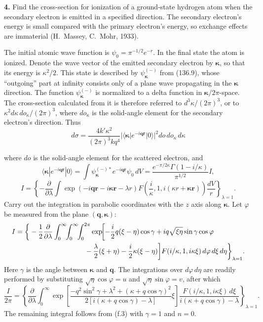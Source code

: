 \noindent\textbf{4.} Find the cross-section for ionization of a ground-state
hydrogen atom when the secondary electron is emitted in a specified direction.
The secondary electron's energy is small compared with the primary electron's
energy, so exchange effects are immaterial (H.~Massey, C.~Mohr, 1933).

\SolutionHeading The initial atomic wave function is
$\psi_0=\pi^{-1/2}e^{-r}$.  In the final state the atom is ionized.  Denote the
wave vector of the emitted secondary electron by $\boldsymbol\kappa$, so that
its energy is $\kappa^2/2$.  This state is described by
$\psi_{\boldsymbol\kappa}^{(-)}$ from (136.9), whose ``outgoing'' part at
infinity consists only of a plane wave propagating in the
$\boldsymbol\kappa$ direction.  The function
$\psi_{\boldsymbol\kappa}^{(-)}$ is normalized to a delta function in
$\boldsymbol\kappa/2\pi$-space.  The cross-section calculated from it is
therefore referred to $d^3\kappa/(2\pi)^3$, or to
$\kappa^2d\kappa\,do_{\kappa}/(2\pi)^3$, where $do_{\kappa}$ is the
solid-angle element for the secondary electron's direction.  Thus
\[
 d\sigma=\frac{4k'\kappa^2}{(2\pi)^3kq^4}
 |\langle\boldsymbol\kappa|e^{-i\mathbf q\mathbf r}|0\rangle|^2
 do\,do_{\kappa}\,d\kappa
\]

where $do$ is the solid-angle element for the scattered electron, and
\[
 \langle\boldsymbol\kappa|e^{-i\mathbf q\mathbf r}|0\rangle
 =\int\psi_{\boldsymbol\kappa}^{(-)*}e^{-i\mathbf q\mathbf r}\psi_0\,dV
 =\frac{e^{-\pi/2\kappa}\Gamma(1-i/\kappa)}{\pi^{1/2}}I,
\]
\[
 I=\left\{-\frac\partial{\partial\lambda}\int
 \exp(-i\mathbf q\mathbf r-i\boldsymbol\kappa\mathbf r-\lambda r)
 F\!\left(\frac i\kappa,1,i(\kappa r+\boldsymbol\kappa\mathbf r)\right)
 \frac{dV}{r}\right\}_{\lambda=1}.
\]
Carry out the integration in parabolic coordinates with the $z$ axis along
$\boldsymbol\kappa$.  Let $\varphi$ be measured from the plane
$(\mathbf q,\boldsymbol\kappa)$:
\[
\begin{split}
 I=\biggl\{&-\frac12\frac\partial{\partial\lambda}
 \int_0^\infty\!\!\int_0^\infty\!\!\int_0^{2\pi}
 \exp\!\biggl[-\frac i2q(\xi-\eta)\cos\gamma
 +iq\sqrt{\xi\eta}\sin\gamma\cos\varphi\\
 &\hspace{28mm}-\frac\lambda2(\xi+\eta)-\frac i2\kappa(\xi-\eta)\biggr]
 F(i/\kappa,1,i\kappa\xi)\,d\varphi\,d\xi\,d\eta\biggr\}_{\lambda=1}.
\end{split}
\]
Here $\gamma$ is the angle between $\boldsymbol\kappa$ and $\mathbf q$.
The integrations over $d\varphi\,d\eta$ are readily performed by substituting
$\sqrt\eta\cos\varphi=u$ and $\sqrt\eta\sin\varphi=v$, after which
\[
 \frac I{2\pi}=\left\{\frac\partial{\partial\lambda}\int_0^\infty
 \exp\!\left[\frac{-q^2\sin^2\gamma+\lambda^2+(\kappa+q\cos\gamma)^2}
 {2[i(\kappa+q\cos\gamma)-\lambda]}\xi\right]
 \frac{F(i/\kappa,1,i\kappa\xi)\,d\xi}{i(\kappa+q\cos\gamma)-\lambda}
 \right\}_{\lambda=1}.
\]
The remaining integral follows from (f.3) with $\gamma=1$ and $n=0$.

